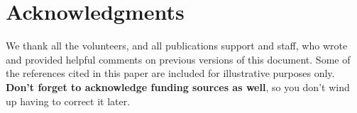 \documentclass{sigchi}
\begin{document}
\section{Acknowledgments}

We thank all the volunteers, and all publications support
and staff, who wrote and provided helpful comments on previous
versions of this document.  Some of the references cited in this paper
are included for illustrative purposes only.  \textbf{Don't forget
to acknowledge funding sources as well}, so you don't wind up
having to correct it later.

%
%
%
%
%
\balance



\end{document}

